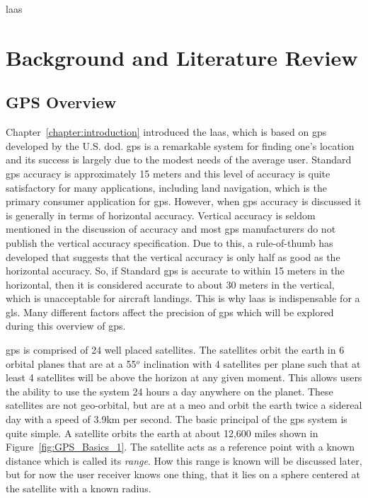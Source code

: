 \ac{laas}\chapter{Background and Literature Review}
\label{ch:background}
\section{GPS Overview}
\acresetall
Chapter~\ref{chapter:introduction} introduced the \ac{laas}, which is based on \ac{gps} developed by the U.S. \ac{dod}.  \ac{gps} is a remarkable system for finding one's location and its success is largely due to the modest needs of the average user. Standard \ac{gps} accuracy is approximately 15 meters\citep[]{GPS_FOR_DUMMIES} and this level of accuracy is quite satisfactory for many applications, including land navigation, which is the primary consumer application for \ac{gps}. However, when \ac{gps} accuracy is discussed it is generally in terms of horizontal accuracy.  Vertical accuracy is seldom mentioned in the discussion of accuracy and most \ac{gps} manufacturers do not publish the vertical accuracy specification.  Due to this, a rule-of-thumb has developed that suggests that the vertical accuracy is only half as good as the horizontal accuracy.  So, if Standard \ac{gps} is accurate to within 15 meters in the horizontal, then it is considered accurate to about 30 meters in the vertical, which is unacceptable for aircraft landings. This is why \ac{laas} is indispensable for a \ac{gls}.  Many different factors affect the precision of \ac{gps} which will be explored during this overview of \ac{gps}.

\ac{gps} is comprised of 24 well placed satellites. The satellites orbit the earth in 6 orbital planes that are at a 55$^o$ inclination with 4 satellites per plane such that at least 4 satellites will be above the horizon at any given moment. This allows users the ability to use the system 24 hours a day anywhere on the planet. These satellites are not geo-orbital, but are at a \ac{meo} and orbit the earth twice a sidereal day with a speed of 3.9km per second.  The basic principal of the \ac{gps} system is quite simple.  A satellite orbits the earth at about 12,600 miles shown in Figure~\ref{fig:GPS_Basics_1}. The satellite acts as a reference point with a known distance which is called its \textit{range}.  How this range is known will be discussed later, but for now the user receiver knows one thing, that it lies on a sphere centered at the satellite with a known radius.

